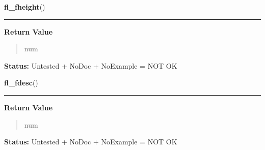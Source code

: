     \vspace{0.5ex}

\hspace{.8\funcindent}\begin{boxedminipage}{\funcwidth}

    \raggedright \textbf{fl\_fheight}()

    \vspace{-1.5ex}

    \rule{\textwidth}{0.5\fboxrule}
\setlength{\parskip}{2ex}
\setlength{\parskip}{1ex}
      \textbf{Return Value}
    \vspace{-1ex}

      \begin{quote}
      num

      \end{quote}

\textbf{Status:} Untested + NoDoc + NoExample = NOT OK



    \end{boxedminipage}

    \label{xformslib:library:fl_fdesc_}

    \vspace{0.5ex}

\hspace{.8\funcindent}\begin{boxedminipage}{\funcwidth}

    \raggedright \textbf{fl\_fdesc}()

    \vspace{-1.5ex}

    \rule{\textwidth}{0.5\fboxrule}
\setlength{\parskip}{2ex}
\setlength{\parskip}{1ex}
      \textbf{Return Value}
    \vspace{-1ex}

      \begin{quote}
      num

      \end{quote}

\textbf{Status:} Untested + NoDoc + NoExample = NOT OK



    \end{boxedminipage}

    \label{xformslib:library:fl_cur_fs_}

